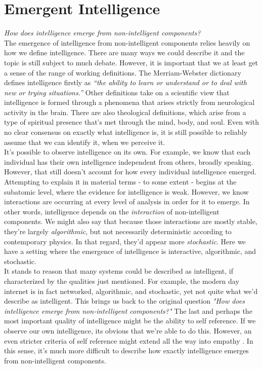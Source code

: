 \documentclass{article}
\begin{document}
\newpage
\section*{Emergent Intelligence}

\textit{How does intelligence emerge from non-intelligent components?}\\

The emergence of intelligence from non-intelligent components relies heavily on how we define intelligence. There are many ways we could describe it and the topic is still subject to much debate. However, it is important that we at least get a sense of the range of working definitions. The Merriam-Webster dictionary defines intelligence firstly as \textit{``the ability to learn or understand or to deal with new or trying situations.''} \cite{dictionary} Other definitions take on a scientific view that intelligence is formed through a phenomena that arises strictly from neurological activity in the brain. \cite{brain} There are also theological definitions, which arise from a type of spiritual presence that's met through the mind, body, and soul. \cite{theology} Even with no clear consensus on exactly what intelligence is, it is still possible to reliably assume that we can identify it, when we perceive it.\\

It's possible to observe intelligence on its own. For example, we know that each individual has their own intelligence independent from others, broadly speaking. However, that still doesn't account for how every individual intelligence emerged. Attempting to explain it in material terms - to some extent - begins at the subatomic level, where the evidence for intelligence is weak. \cite{atomic} However, we know interactions are occurring at every level of analysis in order for it to emerge. \cite{info}\cite{origin} In other words, intelligence depends on the \textit{interaction} of non-intelligent components. We might also say that because those interactions are mostly stable, they're largely \textit{algorithmic}, but not necessarily deterministic according to contemporary physics. In that regard, they'd appear more \textit{stochastic}. \cite{random} Here we have a setting where the emergence of intelligence is interactive, algorithmic, and stochastic.\\

It stands to reason that many systems could be described as intelligent, if characterized by the qualities just mentioned. For example, the modern day internet is in fact networked, algorithmic, and stochastic, yet not quite what we'd describe as intelligent. This brings us back to the original question \textit{"How does intelligence emerge from non-intelligent components?"} The last and perhaps the most important quality of intelligence might be the ability to self reference. If we observe our own intelligence, its obvious that we're able to do this. However, an even stricter criteria of self reference might extend all the way into empathy \cite{empathy}. In this sense, it's much more difficult to describe how exactly intelligence emerges from non-intelligent components.\\
\end{document}
